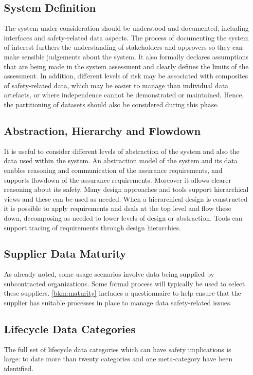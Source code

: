 \subsection{System Definition}
The system under consideration should be understood and documented, including interfaces and safety-related data aspects. The process of documenting the system of interest furthers the understanding of \glspl{stakeholder} and approvers so they can make sensible judgements about the system. It also formally declares assumptions that are being made in the system assessment and clearly defines the limits of the assessment. In addition, different levels of risk may be associated with composites of safety-related data, which may be easier to manage than individual \glspl{data artefact}, or where independence cannot be demonstrated or maintained. Hence, the partitioning of \glspl{dataset} should also be considered during this phase.

\subsection{Abstraction, Hierarchy and Flowdown}\label{bkm:abstraction}
It is useful to consider different levels of abstraction of the system and also the data used within the system. An abstraction model of the system and its data enables reasoning and communication of the assurance requirements, and supports flowdown of the assurance requirements. Moreover it allows clearer reasoning about its safety. Many design approaches and tools support hierarchical views and these can be used as needed. When a hierarchical design is constructed it is possible to apply requirements and \glspl{dsal} at the top level and flow these down, decomposing as needed to lower levels of design or abstraction. Tools can support tracing of requirements through design hierarchies.

\subsection{Supplier Data Maturity}
As already noted, some usage scenarios involve data being supplied by subcontracted organizations. Some formal process will typically be used to select these suppliers. \autoref{bkm:maturity} includes a questionnaire to help ensure that the supplier has suitable processes in place to manage data safety-related issues.

\subsection{Lifecycle Data Categories}
\label{bkm:datacategories}
The full set of lifecycle data categories which can have safety implications is large: to date more than twenty categories and one meta-category have been identified. 

